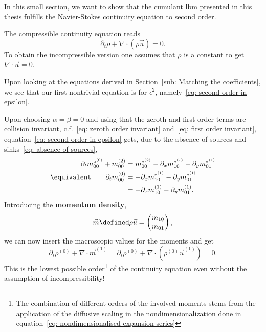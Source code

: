 In this small section, we want to show that the cumulant \gls{lbm} presented in this thesis fulfills the Navier-Stokes continuity equation to second order.

The compressible continuity equation reads
\begin{equation}
  \label{eq: continuity equation}
  \partial_t \rho + \nabla \cdot (\rho \vec{u}) = 0.
\end{equation}
To obtain the incompressible version one assumes that $\rho$ is a constant to get $\nabla\cdot\vec{u}=0$.

Upon looking at the equations derived in Section~\ref{sub: Matching the coefficients}, we see that our first nontrivial equation is for $\epsilon^2$, namely~\eqref{eq: second order in epsilon}.

Upon choosing $\alpha=\beta=0$ and using that the zeroth and first order terms are collision invariant, c.f.~\eqref{eq: zeroth order invariant} and~\eqref{eq: first order invariant}, equation~\eqref{eq: second order in epsilon} gets, due to the absence of sources and sinks~\eqref{eq: absence of sources},
\begin{align}
  \nonumber
  \partial_t m_{00}^{\circ^{(0)}} + m_{00}^{(2)} & =  m_{00}^{*^{(2)}} - \partial_x m_{10}^{*^{(1)}} - \partial_y m_{01}^{*^{(1)}}
   \\\equivalent \qquad
   \partial_t m_{00}^{(0)} & =  - \partial_x m_{10}^{*^{(1)}} - \partial_y m_{01}^{*^{(1)}} \nonumber
   \\
    & =  - \partial_x m_{10}^{(1)} - \partial_y m_{01}^{(1)}.
  \label{eq: continuity moments}
\end{align}
Introducing the \textbf{momentum density},
\begin{equation}
  \vec{m} \defined \rho \vec{u} = \begin{pmatrix}m_{10} \\m_{01}  \end{pmatrix},
\end{equation}
we can now insert the macroscopic values for the moments and get
\begin{equation}
  \partial_t \rho^{(0)} + \nabla \cdot \vec{m}^{(1)} =
  \partial_t \rho^{(0)} + \nabla \cdot (\rho^{(0)} \vec{u}^{(1)}) = 0.
\end{equation}
This is the lowest possible order\footnote{The combination of different orders of the involved moments stems from the application of the diffusive scaling in the nondimensionalization done in equation~\eqref{eq: nondimensionalised expansion series}} of the continuity equation even without the assumption of incompressibility!

